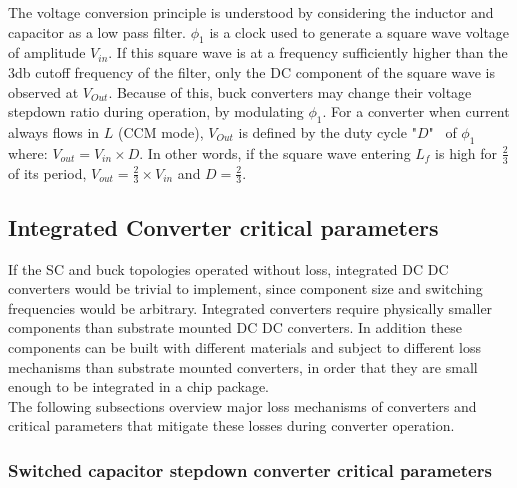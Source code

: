 \documentclass[letterpaper,twocolumn,10pt]{article}
\begin{document}
The voltage conversion principle is understood by considering the inductor and capacitor as a low pass filter. $\phi_1$ is a clock used to generate a square wave voltage of amplitude $V_{in}$. If this square wave is at a frequency sufficiently higher than the 3db cutoff frequency of the filter, only the DC component of the square wave is observed at $V_{Out}$. Because of this, buck converters may change their voltage stepdown ratio during operation, by modulating $\phi_1$. For a converter when current always flows in $L$ (CCM mode), $V_{Out}$ is defined by the duty cycle "$D$"~\cite{Kurson2006} of $\phi_1$ where: $V_{out} = V_{in} \times D$. In other words, if the square wave entering $L_f$ is high for $\frac{2}{3}$ of its period, $V_{out} = \frac{2}{3}\times V_{in}$ and $D = \frac{2}{3}$.\\ 

\subsection{Integrated Converter critical parameters}
If the SC and buck topologies operated without loss, integrated DC DC converters would be trivial to implement, since component size and switching frequencies would be arbitrary. Integrated converters require physically smaller components than substrate mounted DC DC converters. In addition these components can be built with different materials and subject to different loss mechanisms than substrate mounted converters, in order that they are small enough to be integrated in a chip package.\\
The following subsections overview major loss mechanisms of converters and critical parameters that mitigate these losses during converter operation.

\subsubsection{Switched capacitor stepdown converter critical parameters}
\end{document}
